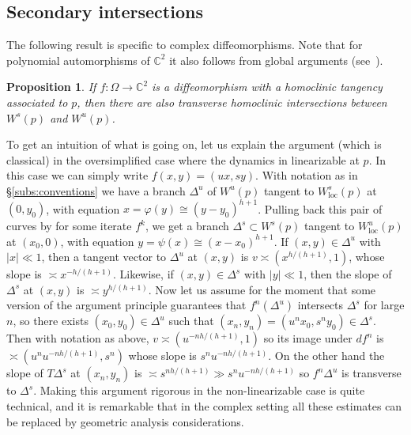 \documentclass[11pt, oneside]{amsart}
\newcommand{\C}{\mathbb{C}}
\newcommand{\abs}[1]{\left\vert#1\right\vert}
\newcommand{\cd}{{\C^2}}
\newcommand{\loc}{{\mathrm{loc}}}
\newtheorem{prop}{Proposition} [section]
\theoremstyle{remark}
\theoremstyle{definition}
\theoremstyle{theorem}
\begin{document}
 
\subsection{Secondary intersections} 
The following result is specific to   complex diffeomorphisms. Note  that for polynomial automorphisms 
of $\C^2$ it also follows from global arguments (see~\cite[\S 9]{bls}). 

\begin{prop}\label{prop:secondary}
If $f:\Omega\to\cd$ is a diffeomorphism with a homoclinic tangency associated to $p$, 
then there are also
 transverse homoclinic intersections between $W^s(p)$ and $W^u(p)$. 
\end{prop}

To get an  intuition of  what is going on, 
let us explain the argument (which is classical) in the oversimplified case 
where the dynamics in linearizable at $p$. In this case we can simply write $f(x,y) = (ux, sy)$. With notation as in \S\ref{subs:conventions} we have a branch $\Delta^u$ of $W^u(p)$ tangent to 
$W_\loc^s(p)$ at $(0, y_0)$, with equation $x = \varphi(y) \cong (y-y_0)^{h+1}$. Pulling back 
this pair of curves by for some 
 iterate $f^k$, we get a branch $\Delta^s  \subset W^s(p)$ tangent 
to $W^u_\loc(p)$ at $(x_0, 0)$, with equation $ y =\psi(x)\cong (x-x_0)^{h+1}$. If $(x,y)\in \Delta^u$ with 
$\abs{x} \ll 1$, then a tangent vector to $\Delta^u$ at $(x,y)$ is   
$v \asymp (x^{h/(h+1)}, 1)$, whose slope is $\asymp x^{ -h/(h+1)}$. Likewise, if 
$(x,y)\in \Delta^s$ with  $\abs{y} \ll 1$, then the  slope of $\Delta^s$ at $(x,y)$ is  
$\asymp y^{ h/(h+1)}$. 
Now let us assume for the moment that some version of the argument principle guarantees that $f^n(\Delta^u)$ intersects $\Delta^s$ for large $n$, so there exists  
$(x_0, y_0)\in \Delta^u$ such that 
$(x_n, y_n) = (u^nx_0, s^ny_0) \in \Delta^s$. Then with notation as above, $v  
\asymp (u^{- nh/(h+1)}, 1)$ so its image under $df^n$ is $\asymp (u^nu^{- nh/(h+1)}, s^n)$ 
 whose slope is $s^nu^{- nh/(h+1)}$. On the other hand the slope of $T\Delta^s$ at 
 $(x_n, y_n)$ is $\asymp s^{n h/(h+1)}  \gg s^nu^{- nh/(h+1)}$ so 
 $f^n\Delta^u$ is transverse to $\Delta^s$. Making this argument rigorous in the non-linearizable case is quite technical, and it is remarkable that in the complex setting 
 all these estimates can be replaced by geometric analysis  considerations.
 
\end{document}
